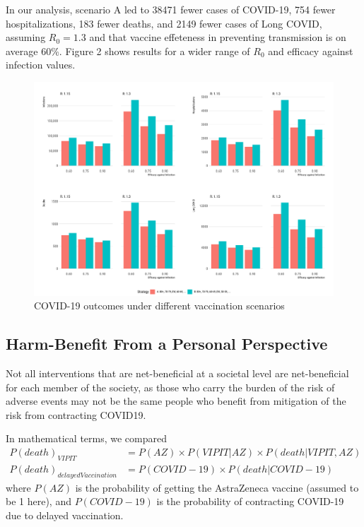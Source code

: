 \documentclass[]{interact}
\theoremstyle{plain}%
\theoremstyle{definition}
\theoremstyle{remark}
\begin{document}
In our analysis, scenario A led to 38471 fewer cases of COVID-19, 754
fewer hospitalizations, 183 fewer deaths, and 2149 fewer cases of Long
COVID, assuming \(R_0=1.3\) and that vaccine effeteness in preventing
transmission is on average 60\%. Figure 2 shows results for a wider
range of \(R_0\) and efficacy against infection values.

\begin{figure}

{\centering \includegraphics[width=1\linewidth]{../figures/fig-barplots} 

}

\caption{COVID-19 outcomes under different vaccination scenarios}\label{fig:fig2}
\end{figure}

\hypertarget{harm-benefit-from-a-personal-perspective}{%
\subsection{Harm-Benefit From a Personal
Perspective}\label{harm-benefit-from-a-personal-perspective}}

Not all interventions that are net-beneficial at a societal level are
net-beneficial for each member of the society, as those who carry the
burden of the risk of adverse events may not be the same people who
benefit from mitigation of the risk from contracting COVID19.

In mathematical terms, we compared \[
\begin{aligned}
P(death)_{VIPIT}  &= P(AZ) \times P(VIPIT|AZ) \times P(death|VIPIT, AZ) \\
P(death)_{delayedVaccination} &= P(COVID-19) \times P(death|COVID-19)
\end{aligned}
\] where \(P(AZ)\) is the probability of getting the AstraZeneca vaccine
(assumed to be 1 here), and \(P(COVID-19)\) is the probability of
contracting COVID-19 due to delayed vaccination.
\end{document}
